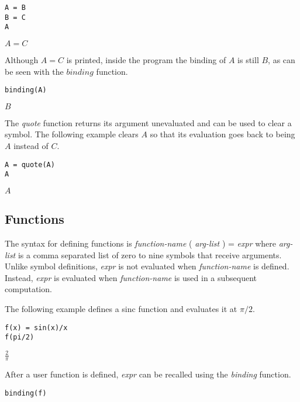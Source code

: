\begin{Verbatim}[formatcom=\color{blue}]
A = B
B = C
A
\end{Verbatim}

\noindent
$\displaystyle A=C$

\bigskip
\noindent
Although $A=C$ is printed,
inside the program the binding of $A$ is still $B$, as can be seen with
the $binding$ function.

\begin{Verbatim}[formatcom=\color{blue}]
binding(A)
\end{Verbatim}

\noindent
$\displaystyle B$

\bigskip
\noindent
The {\it quote} function returns its argument unevaluated
and can be used to clear a symbol.
The following example clears $A$ so that its evaluation goes back to
being $A$ instead of $C$.

\begin{Verbatim}[formatcom=\color{blue}]
A = quote(A)
A
\end{Verbatim}

\noindent
$\displaystyle A$

\subsection{Functions}

\noindent
The syntax for defining functions is {\it function-name} ( {\it arg-list} ) = {\it expr}
where {\it arg-list} is a comma separated list of zero to nine symbols that receive arguments.
Unlike symbol definitions, {\it expr} is not evaluated when {\it function-name} is defined.
Instead, {\it expr} is evaluated when {\it function-name} is used in a subsequent computation.

\bigskip
\noindent
The following example defines a sinc function and evaluates it at $\pi/2$.

\begin{Verbatim}[formatcom=\color{blue}]
f(x) = sin(x)/x
f(pi/2)
\end{Verbatim}

\noindent
$\displaystyle \frac{2}{\pi}$

\bigskip
\noindent
After a user function is defined, {\it expr} can be recalled using the {\it binding} function.

\begin{Verbatim}[formatcom=\color{blue}]
binding(f)
\end{Verbatim}

